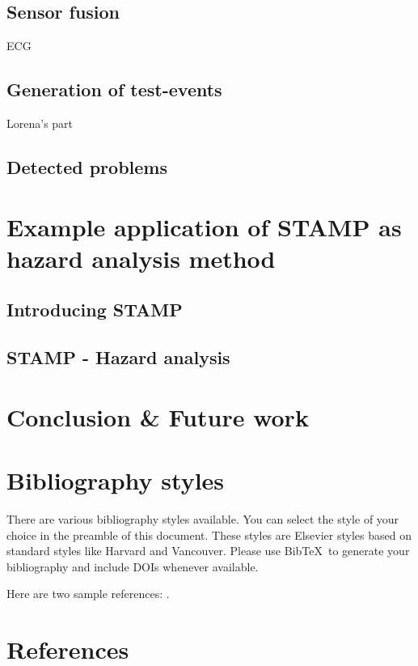 \documentclass[review]{elsarticle}
\begin{document}
\subsection{Sensor fusion}
ECG

\subsection{Generation of test-events}
Lorena's part

\subsection{Detected problems}

\section{Example application of STAMP as hazard analysis method}
\label{sec:STAMP}

\subsection{Introducing STAMP}

\subsection{STAMP - Hazard analysis}

\section{Conclusion \& Future work}
\label{sec:conclusion}

\section{Bibliography styles}

There are various bibliography styles available. You can select the style of your choice in the preamble of this document. These styles are Elsevier styles based on standard styles like Harvard and Vancouver. Please use Bib\TeX\ to generate your bibliography and include DOIs whenever available.

Here are two sample references: \cite{Feynman1963118,Dirac1953888}.

\section*{References}


\end{document}
